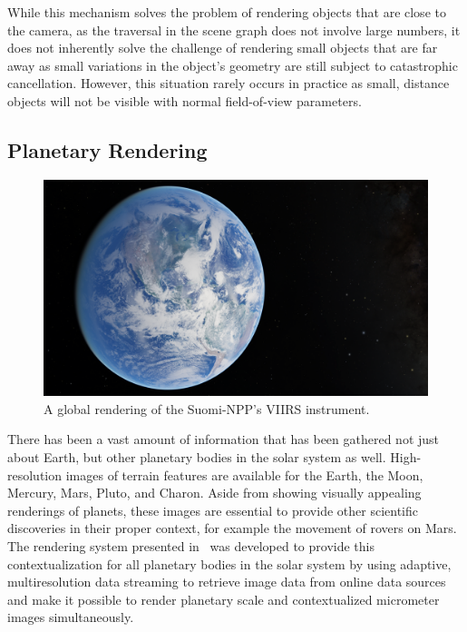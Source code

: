 While this mechanism solves the problem of rendering objects that are close to the camera, as the traversal in the scene graph does not involve large numbers, it does not inherently solve the challenge of rendering small objects that are far away as small variations in the object's geometry are still subject to catastrophic cancellation.  However, this situation rarely occurs in practice as small, distance objects will not be visible with normal field-of-view parameters.



\subsection{Planetary Rendering} \label{contributions:astro:gb}
\begin{figure}
\centering
\includegraphics[width=\abfboximagewidth]{figures/contributions/gb/earth.png}
\caption{A global rendering of the Suomi-NPP's VIIRS instrument.}
\label{contributions:astro:gb:earth}
\end{figure}

There has been a vast amount of information that has been gathered not just about Earth, but other planetary bodies in the solar system as well.  High-resolution images of terrain features are available for the Earth, the Moon, Mercury, Mars, Pluto, and Charon.  Aside from showing visually appealing renderings of planets, these images are essential to provide other scientific discoveries in their proper context, for example the movement of rovers on Mars.  The rendering system presented in \paperGB\ was developed to provide this contextualization for all planetary bodies in the solar system by using adaptive, multiresolution data streaming to retrieve image data from online data sources and make it possible to render planetary scale and contextualized micrometer images simultaneously.


